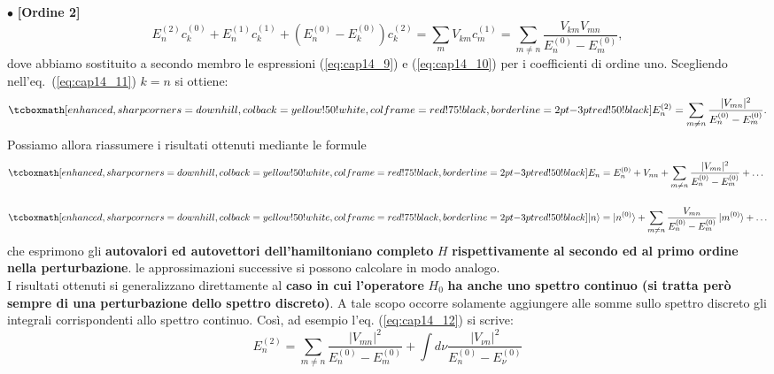 \documentclass[a4paper,12pt,oneside]{book}
\begin{document}
$\bullet$ \textbf{[Ordine 2]}\\
	\begin{equation}
			E_n^{(2)}c_k^{(0)}+E_n^{(1)}c_k^{(1)}+ \left( E_n^{(0)}-E_k ^{(0)}\right) c_k^{(2)}  = \sum _m V_{km} c_m ^{(1)} = \sum _{m\neq n} \frac{V_{km} V_{mn}}{E_n^{(0)}-E_m ^{(0)}},
	\label{eq:cap14_11}
	\end{equation}
dove abbiamo sostituito a secondo membro le espressioni (\ref{eq:cap14_9}) e (\ref{eq:cap14_10}) per i coefficienti di ordine uno. Scegliendo nell'eq.~(\ref{eq:cap14_11}) $k=n$ si ottiene:
	\begin{equation}
		\tcboxmath[enhanced, sharp corners=downhill, colback=yellow!50!white, colframe=red!75!black, borderline={2pt}{-3pt}{red!50!black}]{
			E_n ^{(2)} = \sum _{m \neq n } \frac{\vert V_{mn} \vert ^2}{E_n ^{(0)}-E_m ^{(0)}}.
			}
	\label{eq:cap14_12}
	\end{equation}
Possiamo allora riassumere i risultati ottenuti mediante le formule
	\begin{align}
		& \tcboxmath[enhanced, sharp corners=downhill, colback=yellow!50!white, colframe=red!75!black, borderline={2pt}{-3pt}{red!50!black}]{
			E_n = E_n ^{(0)}+ V_{nn} +\sum _{m \neq n } \frac{\vert V_{mn} \vert ^2}{E_n ^{(0)}-E_m ^{(0)}}+ \dots
			} \\[0.5cm]
		& \tcboxmath[enhanced, sharp corners=downhill, colback=yellow!50!white, colframe=red!75!black, borderline={2pt}{-3pt}{red!50!black}]{
 			\vert n \rangle = \vert n^{(0)} \rangle +\sum _{m \neq n } \frac{V_{mn} }{E_n ^{(0)}-E_m ^{(0)}}\, \vert m^{(0)}\rangle+ \dots 
			 }
	\end{align}
che esprimono gli \textbf{autovalori ed autovettori dell'hamiltoniano completo} $H$ \textbf{rispettivamente al secondo ed al primo ordine nella perturbazione}. le approssimazioni successive si possono calcolare in modo analogo.\\

I risultati ottenuti si generalizzano direttamente al \textbf{caso in cui l'operatore} $H_0$ \textbf{ha anche uno spettro continuo (si tratta però sempre di una perturbazione dello spettro discreto)}. A tale scopo occorre solamente aggiungere alle somme sullo spettro discreto gli integrali corrispondenti allo spettro continuo. Così, ad esempio l'eq. (\ref{eq:cap14_12}) si scrive:
	\begin{equation}
		E_n ^{(2)} = \sum _{m \neq n} \frac{\vert V_{mn} \vert ^2}{E_n ^{(0)}-E_m ^{(0)}}+ \int d\nu \frac{\vert V_{\nu n} \vert ^2}{E_n ^{(0)}-E_{\nu} ^{(0)}} 
	\end{equation}
\end{document}

